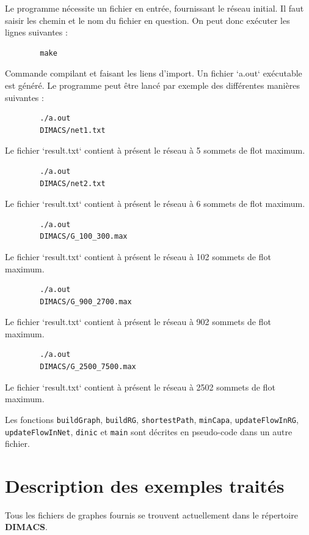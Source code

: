 \documentclass[11pt, a4paper]{report}
\begin{document}
	Le programme nécessite un fichier en entrée, fournissant le réseau initial. Il faut saisir les chemin et le nom du fichier en question. On peut donc exécuter les lignes suivantes :
	\lstset{language=bash}
	\begin{lstlisting}
		make
	\end{lstlisting}
	Commande compilant et faisant les liens d'import. Un fichier `a.out` exécutable est généré. Le programme peut être lancé par exemple des différentes manières suivantes :

	\begin{lstlisting}
		./a.out
		DIMACS/net1.txt
	\end{lstlisting}
	Le fichier `result.txt` contient à présent le réseau à 5 sommets de flot maximum.

	\begin{lstlisting}
		./a.out
		DIMACS/net2.txt
	\end{lstlisting}
	Le fichier `result.txt` contient à présent le réseau à 6 sommets de flot maximum.

	\begin{lstlisting}
		./a.out
		DIMACS/G_100_300.max
	\end{lstlisting}
	Le fichier `result.txt` contient à présent le réseau à 102 sommets de flot maximum.

	\begin{lstlisting}
		./a.out
		DIMACS/G_900_2700.max
	\end{lstlisting}
	Le fichier `result.txt` contient à présent le réseau à 902 sommets de flot maximum.

	\begin{lstlisting}
		./a.out
		DIMACS/G_2500_7500.max
	\end{lstlisting}
	Le fichier `result.txt` contient à présent le réseau à 2502 sommets de flot maximum.

	Les fonctions \verb|buildGraph|, \verb|buildRG|, \verb|shortestPath|, \verb|minCapa|, \verb|updateFlowInRG|, \verb|updateFlowInNet|, \verb|dinic| et \verb|main| sont décrites en pseudo-code dans un autre fichier.




	\chapter{Description des exemples traités}

	Tous les fichiers de graphes fournis se trouvent actuellement dans le répertoire \textbf{DIMACS}.
\end{document}
